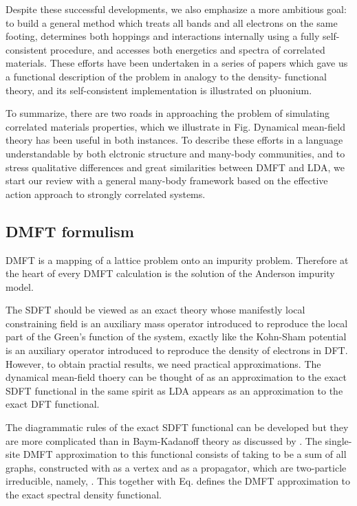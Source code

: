 \documentclass[12 pt]{article}
\begin{document}
{  Despite these successful developments, we also emphasize a more ambitious goal: to build a general method which treats 
all bands and all electrons on the same footing, determines both hoppings and interactions internally using a fully 
self-consistent procedure, and accesses both energetics and spectra of correlated materials. These efforts have been 
undertaken in a series of papers which gave us a functional description of the problem in analogy to the density-
functional theory, and its self-consistent implementation is illustrated on pluonium. 

  To summarize, there are two roads in approaching the problem of simulating correlated materials properties, which 
we illustrate in Fig. Dynamical mean-field theory has been useful in both instances. To describe these efforts in a 
language understandable by both elctronic structure and many-body communities, and to stress qualitative differences 
and great similarities between DMFT and LDA, we start our review with a general many-body framework based on the 
effective action approach to strongly correlated systems. 

  \citep {Kotliar2006}

      \newpage
      \subsection{DMFT formulism}\label{subsec:DMFT formulism}

DMFT is a mapping of a lattice problem onto an impurity problem. Therefore at the heart of every DMFT calculation 
is the solution of the Anderson impurity model.

  The SDFT should be viewed as an exact theory whose manifestly local constraining field is an auxiliary mass 
operator introduced to reproduce the local part of the Green's function of the system, exactly like the Kohn-Sham 
potential is an auxiliary operator introduced to reproduce the density of electrons in DFT. However, to obtain
 practial results, we need practical approximations. The dynamical mean-field thoery can be thought of as an approximation 
to the exact SDFT functional in the same spirit as LDA appears as an approximation to the exact DFT functional.

  The diagrammatic rules of the exact SDFT functional can be developed but they are more complicated than in 
Baym-Kadanoff theory as discussed by . The single-site DMFT approximation to this functional consists of taking 
to be a sum of all graphs, constructed with as a vertex and as a propagator, which are two-particle irreducible, 
namely, . This together with Eq. defines the DMFT approximation to the exact spectral density functional. 

}
\end{document}
